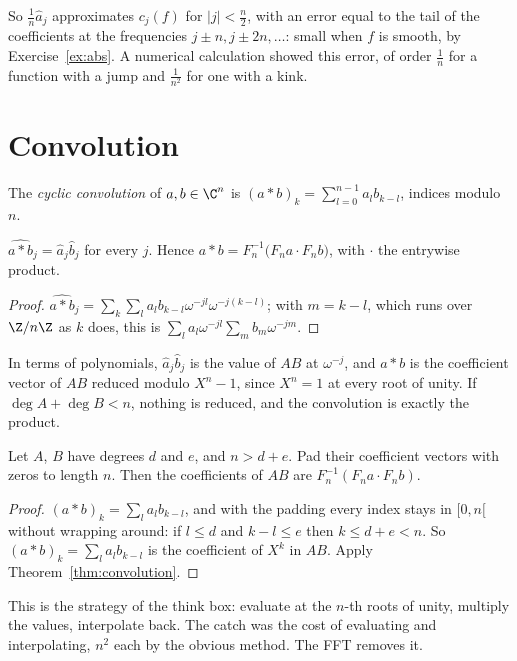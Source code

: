 So $\frac1n\hat a_j$ approximates $c_j(f)$ for $|j|<\frac n2$, with an error equal to the tail of the coefficients at the frequencies
$j\pm n,j\pm2n,\dots$: small when $f$ is smooth, by Exercise~\ref{ex:abs}. A numerical calculation showed this error, of order
$\frac1n$ for a function with a jump and $\frac1{n^2}$ for one with a kink.

\section{Convolution}

\begin{definition}
The \emph{cyclic convolution} of $a,b\in\C^n$ is $(a*b)_k=\sum_{l=0}^{n-1}a_lb_{k-l}$, indices modulo $n$.
\end{definition}

\begin{theorem}\label{thm:convolution}
$\widehat{a*b}_j=\hat a_j\hat b_j$ for every $j$. Hence $a*b=F_n^{-1}\bigl(F_na\cdot F_nb\bigr)$, with $\cdot$ the entrywise product.
\end{theorem}
\begin{proof}
$\widehat{a*b}_j=\sum_k\sum_la_lb_{k-l}\omega^{-jl}\omega^{-j(k-l)}$; with $m=k-l$, which runs over $\Z/n\Z$ as $k$ does, this is
$\sum_la_l\omega^{-jl}\sum_mb_m\omega^{-jm}$.
\end{proof}

In terms of polynomials, $\hat a_j\hat b_j$ is the value of $AB$ at $\omega^{-j}$, and $a*b$ is the coefficient vector of $AB$ reduced modulo $X^n-1$, since
$X^n=1$ at every root of unity. If $\deg A+\deg B<n$, nothing is reduced, and the convolution is exactly the product.

\begin{corollary}\label{cor:polymul}
Let $A$, $B$ have degrees $d$ and $e$, and $n>d+e$. Pad their coefficient vectors with zeros to length $n$. Then the coefficients of $AB$
are $F_n^{-1}(F_na\cdot F_nb)$.
\end{corollary}
\begin{proof}
$(a*b)_k=\sum_la_lb_{k-l}$, and with the padding every index stays in $[0,n[$ without wrapping around: if $l\le d$ and $k-l\le e$
then $k\le d+e<n$. So $(a*b)_k=\sum_{l}a_lb_{k-l}$ is the coefficient of $X^k$ in $AB$. Apply Theorem~\ref{thm:convolution}.
\end{proof}

This is the strategy of the think box: evaluate at the $n$-th roots of unity, multiply the values, interpolate back. The
catch was the cost of evaluating and interpolating, $n^2$ each by the obvious method. The FFT removes it.

